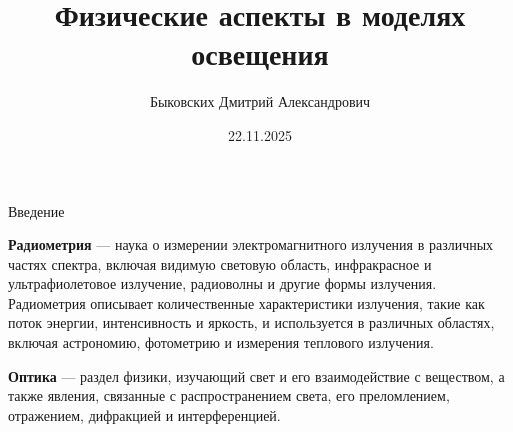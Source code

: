 \documentclass{beamer}
\title[Физические аспекты]{Физические аспекты в моделях освещения}
\author[Быковских Д.А.]{Быковских Дмитрий Александрович}
\date{22.11.2025}
\begin{document}
	\begin{frame}
		\titlepage
	\end{frame}

	\begin{frame}{Введение}

		\textbf{Радиометрия} --- наука о измерении электромагнитного излучения в различных частях спектра, включая видимую световую область, инфракрасное и ультрафиолетовое излучение, радиоволны и другие формы излучения. \\
		Радиометрия описывает количественные характеристики излучения, такие как поток энергии, интенсивность и яркость, и используется в различных областях, включая астрономию, фотометрию и измерения теплового излучения.
		
		\vspace{0.15cm}
		\textbf{Оптика} --- раздел физики, изучающий свет и его взаимодействие с веществом, а также явления, связанные с распространением света, его преломлением, отражением, дифракцией и интерференцией.
			
	\end{frame}
\end{document}
